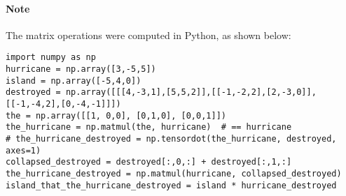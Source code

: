 \documentclass[]{article}
\begin{document}
\paragraph{Note}The matrix operations were computed in Python, as shown below:
\begin{verbatim}
import numpy as np
hurricane = np.array([3,-5,5])
island = np.array([-5,4,0])
destroyed = np.array([[[4,-3,1],[5,5,2]],[[-1,-2,2],[2,-3,0]], [[-1,-4,2],[0,-4,-1]]])
the = np.array([[1, 0,0], [0,1,0], [0,0,1]])
the_hurricane = np.matmul(the, hurricane)  # == hurricane
# the_hurricane_destroyed = np.tensordot(the_hurricane, destroyed, axes=1)
collapsed_destroyed = destroyed[:,0,:] + destroyed[:,1,:]
the_hurricane_destroyed = np.matmul(hurricane, collapsed_destroyed)
island_that_the_hurricane_destroyed = island * hurricane_destroyed
\end{verbatim}
\end{document}
